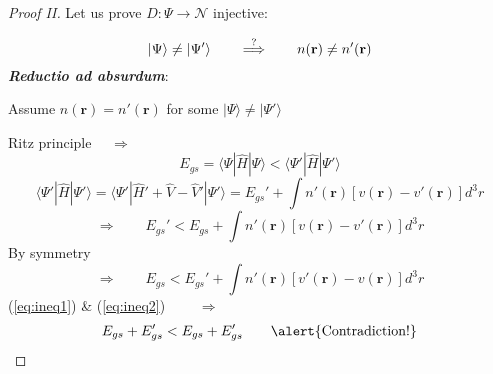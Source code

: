 \documentclass[compress]{beamer}
\newcommand*{\ket}[1]{|#1\rangle}
\newcommand*{\bra}[1]{\langle#1|}
\begin{document}
\frame
 {
   \frametitle{}
 \begin{small}
 {\scriptsize
\begin{proof}[Proof II]
  Let us prove $D:\Psi \longrightarrow \mathcal{N}$ injective:

\begin{equation}
  \ket{\Psi}\neq \ket{\Psi'} \qquad \stackrel{{\LARGE ?}}{\Longrightarrow } \qquad n(\mathbf{r})\neq n'(\mathbf{r}) \nonumber
\end{equation}
\textbf{\emph{Reductio ad absurdum}}: 
\vspace{1mm}

Assume $n(\mathbf{r})=n'(\mathbf{r})$ for some $\ket{\Psi}\neq \ket{\Psi'}$ 

Ritz principle $\quad \Longrightarrow $
\begin{equation}
  E_{gs}=\bra{\Psi}\hat{H}\ket{\Psi}<\bra{\Psi'}\hat{H}\ket{\Psi'} \nonumber   
\end{equation}
\begin{equation}
  \bra{\Psi'}\hat{H}\ket{\Psi'}=\bra{\Psi'}\hat{H}'+\hat{V}-\hat{V}'\ket{\Psi'}=E_{gs}'+\int n'(\mathbf{r})[v(\mathbf{r})-v'(\mathbf{r})]d^{3}r \nonumber
\end{equation}
\begin{equation}\label{eq:ineq1}
  \Longrightarrow \qquad E_{gs}'<E_{gs}+\int n'(\mathbf{r})[v(\mathbf{r})-v'(\mathbf{r})]d^{3}r %
\end{equation}
By symmetry
\begin{equation}\label{eq:ineq2}
  \Longrightarrow \qquad E_{gs}<E_{gs}'+\int n'(\mathbf{r})[v'(\mathbf{r})-v(\mathbf{r})]d^{3}r %
\end{equation}
(\ref{eq:ineq1}) \& (\ref{eq:ineq2}) $\qquad \Longrightarrow $
\begin{equation}
  E_{gs}+E_{gs}'<E_{gs}+E_{gs}' \qquad \text{\alert{Contradiction!}} \nonumber
\end{equation}
\end{proof}
 }
 \end{small}
 }
\end{document}
